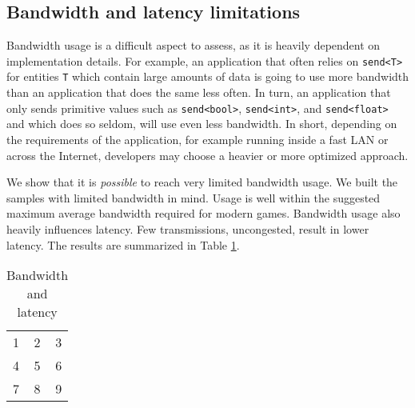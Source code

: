 \subsection{Bandwidth and latency limitations}
Bandwidth usage is a difficult aspect to assess, as it is heavily dependent on implementation details. For example, an application that often relies on \texttt{send<T>} for entities \texttt{T} which contain large amounts of data is going to use more bandwidth than an application that does the same less often. In turn, an application that only sends primitive values such as \texttt{send<bool>}, \texttt{send<int>}, and \texttt{send<float>} and which does so seldom, will use even less bandwidth. In short, depending on the requirements of the application, for example running inside a fast LAN or across the Internet, developers may choose a heavier or more optimized approach.

We show that it is \textit{possible} to reach very limited bandwidth usage. We built the samples \cite{CNV_MULTIPLAYER_SAMPLES} with limited bandwidth in mind. Usage is well within the suggested maximum average bandwidth required for modern games. Bandwidth usage also heavily influences latency. Few transmissions, uncongested, result in lower latency. The results are summarized in Table \ref{tab:bandwidth and latency}.

\begin{table}
\center
\begin{tabular}{ l c r }
  1 & 2 & 3 \\
  4 & 5 & 6 \\
  7 & 8 & 9 \\
\end{tabular}
\label{tab:bandwidth and latency}
\caption{Bandwidth and latency}
\end{table}
